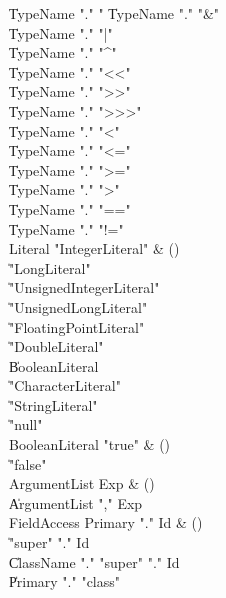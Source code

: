 \begin{bbgrammar}

    \| TypeName \xcd"." \xcd"%
    \| TypeName \xcd"." \xcd"&"\\
    \| TypeName \xcd"." \xcd"|"\\
    \| TypeName \xcd"." \xcd"^"\\
    \| TypeName \xcd"." \xcd"<<"\\
    \| TypeName \xcd"." \xcd">>"\\
    \| TypeName \xcd"." \xcd">>>"\\
    \| TypeName \xcd"." \xcd"<"\\
    \| TypeName \xcd"." \xcd"<="\\
    \| TypeName \xcd"." \xcd">="\\
    \| TypeName \xcd"." \xcd">"\\
    \| TypeName \xcd"." \xcd"=="\\
    \| TypeName \xcd"." \xcd"!="\\
 Literal  \label{prod:Literal}  \: \xcd"IntegerLiteral"  & ()\\
    \| \xcd"LongLiteral" \\
    \| \xcd"UnsignedIntegerLiteral" \\
    \| \xcd"UnsignedLongLiteral" \\
    \| \xcd"FloatingPointLiteral" \\
    \| \xcd"DoubleLiteral" \\
    \| BooleanLiteral\\
    \| \xcd"CharacterLiteral" \\
    \| \xcd"StringLiteral" \\
    \| \xcd"null"\\
 BooleanLiteral  \label{prod:BooleanLiteral}  \: \xcd"true"  & ()\\
    \| \xcd"false" \\
 ArgumentList  \label{prod:ArgumentList}  \: Exp & ()\\
    \| ArgumentList \xcd"," Exp\\
 FieldAccess  \label{prod:FieldAccess}  \: Primary \xcd"." Id & ()\\
    \| \xcd"super" \xcd"." Id\\
    \| ClassName \xcd"." \xcd"super"  \xcd"." Id\\
    \| Primary \xcd"." \xcd"class" \\

\end{bbgrammar}
